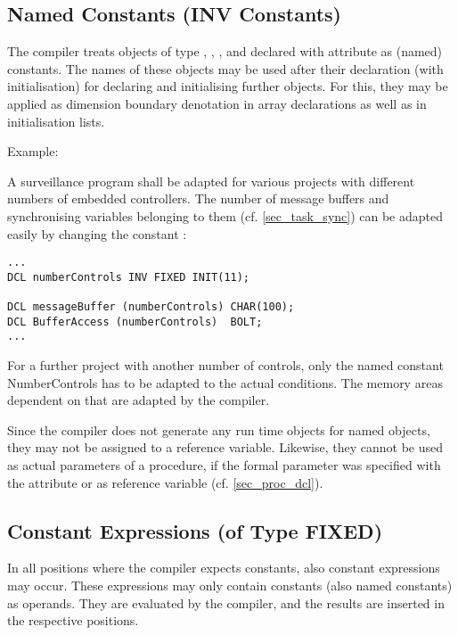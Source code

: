 \subsection{Named Constants (INV Constants)}   %
\label{sec_named_const}

The compiler treats objects of type , ,
 ,  and
 declared with attribute 
 as (named) constants. The names of
these objects may be used after their declaration (with initialisation)
for declaring and initialising further objects. For this, they may be
applied as dimension boundary denotation in array declarations as well
as in initialisation lists.

\begin{minipage}{\linewidth}
Example:

A surveillance program shall be adapted for various projects with
different numbers of embedded controllers. The number of message
buffers and synchronising variables belonging to them 
(cf. \ref{sec_task_sync}) can be
adapted easily by changing the constant :

\begin{lstlisting}
...
DCL numberControls INV FIXED INIT(11);

DCL messageBuffer (numberControls) CHAR(100); 
DCL BufferAccess (numberControls)  BOLT;
...
\end{lstlisting}
\end{minipage}

For a further project with another number of controls, only the named
constant NumberControls has to be adapted to the actual conditions. The
memory areas dependent on that are adapted by the compiler.

Since the compiler does not generate any run time objects for named
objects, they may not be assigned to a reference variable. Likewise,
they cannot be used as actual parameters of a procedure, if the formal
parameter was specified with the   attribute or as reference
variable (cf. \ref{sec_proc_dcl}).

\subsection{Constant Expressions (of Type FIXED)}   %
\label{sec_const_expression}

In all positions where the compiler expects constants, also constant
expressions may occur. These expressions may only contain constants
(also named constants) as operands. They are evaluated by the compiler,
and the results are inserted in the respective positions.

